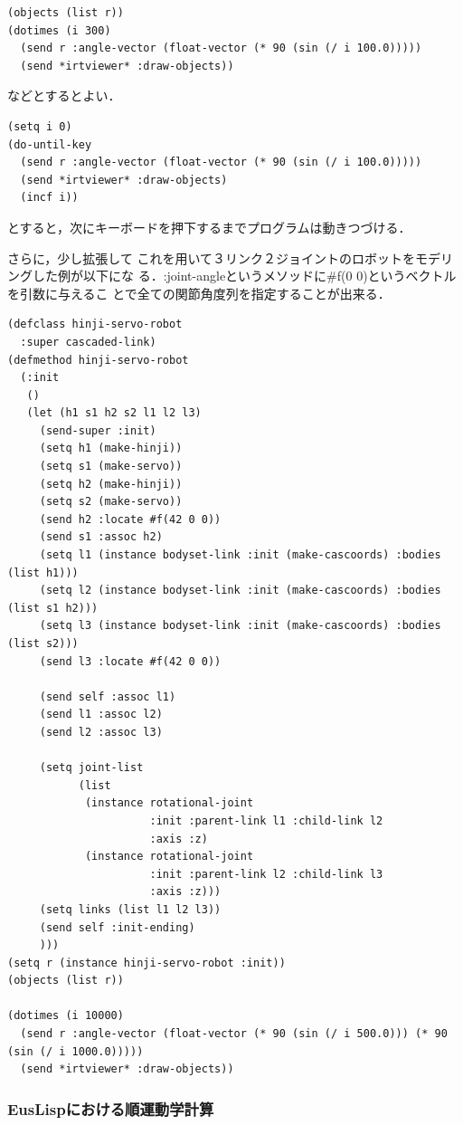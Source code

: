 {\baselineskip=10pt
\begin{verbatim}
(objects (list r))
(dotimes (i 300)
  (send r :angle-vector (float-vector (* 90 (sin (/ i 100.0)))))
  (send *irtviewer* :draw-objects))
\end{verbatim}
}

などとするとよい．

{\baselineskip=10pt
\begin{verbatim}
(setq i 0)
(do-until-key
  (send r :angle-vector (float-vector (* 90 (sin (/ i 100.0)))))
  (send *irtviewer* :draw-objects)
  (incf i))
\end{verbatim}
}
とすると，次にキーボードを押下するまでプログラムは動きつづける．

さらに，少し拡張して
これを用いて３リンク２ジョイントのロボットをモデリングした例が以下にな
る．:joint-angleというメソッドに\#f(0 0)というベクトルを引数に与えるこ
とで全ての関節角度列を指定することが出来る．

{\baselineskip=10pt
\begin{verbatim}
(defclass hinji-servo-robot
  :super cascaded-link)
(defmethod hinji-servo-robot
  (:init
   ()
   (let (h1 s1 h2 s2 l1 l2 l3)
     (send-super :init)
     (setq h1 (make-hinji))
     (setq s1 (make-servo))
     (setq h2 (make-hinji))
     (setq s2 (make-servo))
     (send h2 :locate #f(42 0 0))
     (send s1 :assoc h2)
     (setq l1 (instance bodyset-link :init (make-cascoords) :bodies (list h1)))
     (setq l2 (instance bodyset-link :init (make-cascoords) :bodies (list s1 h2)))
     (setq l3 (instance bodyset-link :init (make-cascoords) :bodies (list s2)))
     (send l3 :locate #f(42 0 0))

     (send self :assoc l1)
     (send l1 :assoc l2)
     (send l2 :assoc l3)

     (setq joint-list
           (list
            (instance rotational-joint
                      :init :parent-link l1 :child-link l2
                      :axis :z)
            (instance rotational-joint
                      :init :parent-link l2 :child-link l3
                      :axis :z)))
     (setq links (list l1 l2 l3))
     (send self :init-ending)
     )))
(setq r (instance hinji-servo-robot :init))
(objects (list r))

(dotimes (i 10000)
  (send r :angle-vector (float-vector (* 90 (sin (/ i 500.0))) (* 90 (sin (/ i 1000.0)))))
  (send *irtviewer* :draw-objects))
\end{verbatim}
}

\subsubsection{EusLispにおける順運動学計算}

